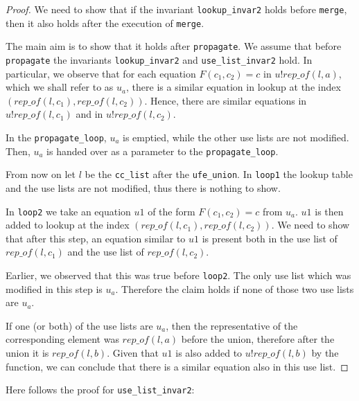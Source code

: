 \begin{proof}
We need to show that if the invariant \lstinline{lookup_invar2} holds before \lstinline{merge}, then it also holds after the execution of \lstinline|merge|.

The main aim is to show that it holds after \lstinline{propagate}.
We assume that before \lstinline{propagate} the invariants \lstinline{lookup_invar2} and \lstinline{use_list_invar2} hold.
In particular, we observe that for each equation $F(c_1, c_2) = c$ in $u ! rep\_of(l, a)$, which we shall refer to as $u_a$, there is a similar equation in lookup at the index $(rep\_of(l, c_1), rep\_of(l, c_2))$.
Hence, there are similar equations in $u ! rep\_of(l, c_1)$ and in $u ! rep\_of(l, c_2)$.

In the \lstinline{propagate_loop}, $u_a$ is emptied, while the other use lists are not modified. Then, $u_a$ is handed over as a parameter to the \lstinline{propagate_loop}.

From now on let $l$ be the \lstinline{cc_list} after the \lstinline{ufe_union}.
In \lstinline{loop1} the lookup table and the use lists are not modified, thus there is nothing to show.

In \lstinline{loop2} we take an equation $u1$ of the form $F(c_1, c_2) = c$ from $u_a$.
$u1$ is then added to lookup at the index $(rep\_of(l, c_1), rep\_of(l, c_2))$. We need to show that after this step, an equation similar to $u1$ is present both in the use list of $rep\_of(l, c_1)$ and the use list of $rep\_of(l, c_2)$.

Earlier, we observed that this was true before \lstinline{loop2}. The only use list which was modified in this step is $u_a$. Therefore the claim holds if none of those two use lists are $u_a$.

If one (or both) of the use lists are $u_a$, then the representative of the corresponding element was $rep\_of(l,a)$ before the union, therefore after the union it is $rep\_of(l,b)$. Given that $u1$ is also added to $u ! rep\_of(l, b)$ by the function, we can conclude that there is a similar equation also in this use list.
\end{proof}

Here follows the proof for \lstinline{use_list_invar2}:

